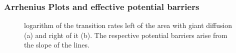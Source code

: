 \documentclass[12pt,a4paper]{article}
\begin{document}
\subsubsection{Arrhenius Plots and effective potential barriers}
\begin{figure}[H]
	\hspace*{-0.5cm}
	\caption{logarithm of the transition rates left of the area with giant diffusion (a) and right of it (b). The respective potential barriers arise from the slope of the lines.}
	\label{arrhplotsrinzel}
\end{figure}
\end{document}
